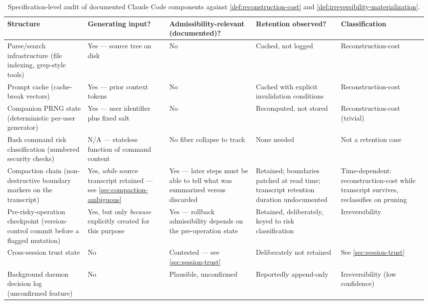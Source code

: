 \documentclass[11pt]{book}
\theoremstyle{plain}
\theoremstyle{definition}
\theoremstyle{remark}
\begin{document}
\begin{table}[htbp]
\centering
\footnotesize
\setlength{\tabcolsep}{3pt}
\begin{tabular}{p{2.7cm}p{1.4cm}p{2.3cm}p{2.3cm}p{2.1cm}}
\toprule
\textbf{Structure} & \textbf{Generating input?} & \textbf{Admissibility-relevant (documented)?} & \textbf{Retention observed?} & \textbf{Classification} \\
\midrule
Parse/search infrastructure (file indexing, grep-style tools) & Yes --- source tree on disk & No & Cached, not logged & Reconstruction-cost \\
Prompt cache (cache-break vectors) & Yes --- prior context tokens & No & Cached with explicit invalidation conditions & Reconstruction-cost \\
Companion PRNG state (deterministic per-user generator) & Yes --- user identifier plus fixed salt & No & Recomputed, not stored & Reconstruction-cost (trivial) \\
Bash command risk classification (numbered security checks) & N/A --- stateless function of command content & No fiber collapse to track & None needed & Not a retention case \\
Compaction chain (non-destructive boundary markers on the transcript) & Yes, \emph{while} source transcript retained --- see \cref{sec:compaction-ambiguous} & Yes --- later steps must be able to tell what was summarized versus discarded & Retained; boundaries patched at read time; transcript retention duration undocumented & Time-dependent: reconstruction-cost while transcript survives, reclassifies on pruning \\
Pre-risky-operation checkpoint (version-control commit before a flagged mutation) & Yes, but only \emph{because} explicitly created for this purpose & Yes --- rollback admissibility depends on the pre-operation state & Retained, deliberately, keyed to risk classification & Irreversibility \\
Cross-session trust state & No & Contested --- see \cref{sec:session-trust} & Deliberately not retained & See \cref{sec:session-trust} \\
Background daemon decision log (unconfirmed feature) & No & Plausible, unconfirmed & Reportedly append-only & Irreversibility (low confidence) \\
\bottomrule
\end{tabular}
\caption{Specification-level audit of documented Claude Code components against \cref{def:reconstruction-cost} and \cref{def:irreversibility-materialization}.}
\label{tab:leak-audit}
\end{table}
\end{document}
